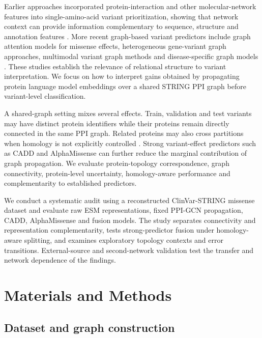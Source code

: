 \documentclass[conference]{IEEEtran}
\begin{document}
Earlier approaches incorporated protein-interaction and other molecular-network features into single-amino-acid variant prioritization, showing that network context can provide information complementary to sequence, structure and annotation features \cite{Yates2014SuSPect,Ozturk2022NetworkFeatures}. More recent graph-based variant predictors include graph attention models for missense effects, heterogeneous gene-variant graph approaches, multimodal variant graph methods and disease-specific graph models \cite{Zhang2022gMVP,Cheng2021VEGN,Yu2025GNNMAP,Ghadie2025DiseaseSpecificGNN}. These studies establish the relevance of relational structure to variant interpretation. We focus on how to interpret gains obtained by propagating protein language model embeddings over a shared STRING PPI graph before variant-level classification.

A shared-graph setting mixes several effects. Train, validation and test variants may have distinct protein identifiers while their proteins remain directly connected in the same PPI graph. Related proteins may also cross partitions when homology is not explicitly controlled \cite{Littmann2022ProteinMLTips,Teufel2023GraphPart}. Strong variant-effect predictors such as CADD and AlphaMissense can further reduce the marginal contribution of graph propagation. We evaluate protein-topology correspondence, graph connectivity, protein-level uncertainty, homology-aware performance and complementarity to established predictors.

We conduct a systematic audit using a reconstructed ClinVar-STRING missense dataset and evaluate raw ESM representations, fixed PPI-GCN propagation, CADD, AlphaMissense and fusion models. The study separates connectivity and representation complementarity, tests strong-predictor fusion under homology-aware splitting, and examines exploratory topology contexts and error transitions. External-source and second-network validation test the transfer and network dependence of the findings.

\section{Materials and Methods}

\subsection{Dataset and graph construction}
\end{document}
